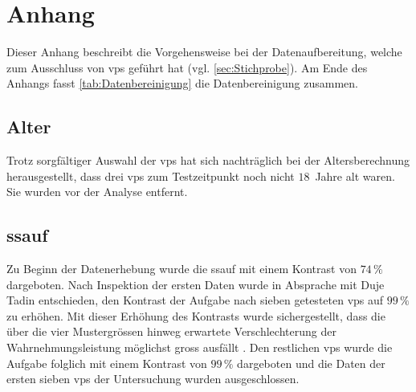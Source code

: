 \documentclass[11pt, twoside, a4paper]{book}		%
\begin{document}
\renewcommand\bibname{Literatur}				%

\appendix
\setcounter{figure}{0}
\renewcommand\thefigure{\Alph{appndx}\@arabic\c@figure}
\setcounter{table}{0}
\renewcommand{\thetable}{A\arabic{table}}



\chapter{Anhang \label{cha:AAnhang}}
Dieser Anhang beschreibt die Vorgehensweise bei der Datenaufbereitung, welche zum Ausschluss von \glspl{vp} geführt hat (vgl. \autoref{sec:Stichprobe}). Am Ende des Anhangs fasst \autoref{tab:Datenbereinigung} die Datenbereinigung zusammen.

\section{Alter}
Trotz sorgfältiger Auswahl der \glspl{vp} hat sich nachträglich bei der Altersberechnung herausgestellt, dass drei \glspl{vp} zum Testzeitpunkt noch nicht $18$~Jahre alt waren. Sie wurden vor der Analyse entfernt.


\section{\gls{ssauf}}
Zu Beginn der Datenerhebung wurde die \gls{ssauf} mit einem Kontrast von $74\,\%$ dargeboten. Nach Inspektion der ersten Daten wurde in Absprache mit Duje Tadin entschieden, den Kontrast der Aufgabe nach sieben getesteten \glspl{vp} auf $99\,\%$ zu erhöhen. Mit dieser Erhöhung des Kontrasts wurde sichergestellt, dass die über die vier Mustergrössen hinweg erwartete Verschlechterung der Wahrnehmungsleistung möglichst gross ausfällt \citep{Tadin2003}. Den restlichen \glspl{vp} wurde die Aufgabe folglich mit einem Kontrast von $99\,\%$ dargeboten und die Daten der ersten sieben \glspl{vp} der Untersuchung wurden ausgeschlossen.
\end{document}
